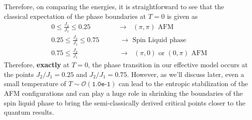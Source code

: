 \documentclass[../thesis_main.tex]{subfiles}
\begin{document}
\!\!\!\!
Therefore, on comparing the energies, it is straightforward to see that the classical expectation of the phase boundaries at $T = 0$ is given as
\begin{align*}
    &0 \leq \frac{J_2}{J_1} \leq 0.25 \qquad \qquad \longrightarrow \text{ $(\pi, \pi)$ AFM} \\
    &0.25 \leq \frac{J_2}{J_1} \leq 0.75 \quad\qquad \longrightarrow \text{ Spin Liquid phase} \\
    &0.75 \leq \frac{J_2}{J_1} \qquad \qquad \qquad \longrightarrow \text{ $(\pi, 0)$ or $(0, \pi)$  AFM}
\end{align*}
Therefore, \textbf{exactly} at $T=0$, the phase transition in our effective model occurs at the points $J_2/J_1 = 0.25$ and $J_2/J_1 = 0.75$. However, as we'll discuss later, even a small temperature of $T\sim \mathcal{O}(\texttt{1.0e-1})$ can lead to the entropic stabilization of the AFM configurations and can play a huge role in shrinking the boundaries of the spin liquid phase to bring the semi-classically derived critical points closer to the quantum results.
\end{document}
